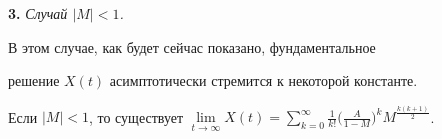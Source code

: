 \medskip 


 


{\bf 3.} {\it Случай $|M|<1$.} 


В этом случае, как будет сейчас показано, фундаментальное 


решение $X(t)$ асимптотически стремится к некоторой константе. 


 


\begin{thm} 


Если $|M|<1$, то существует $\lim\limits_{t\to\infty}X(t)= 


\sum\limits^\infty_{k=0}\frac{1}{k!}\big(\frac{A}{1-M}\big)^k 


M^{\frac{k(k+1)}{2}}$. 


\end{thm} 


 


